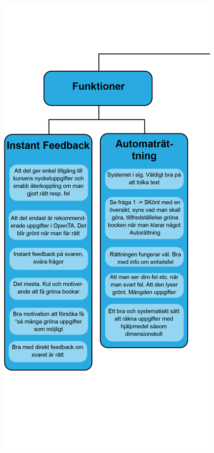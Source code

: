 \begin{figure}[hbtp]
    \centering
    \includegraphics[scale=0.56,angle=90]{appendix/appendix_blue/nr7_part1.png}
    \caption*{}
    \label{fig:nr7_part1}
\end{figure}


